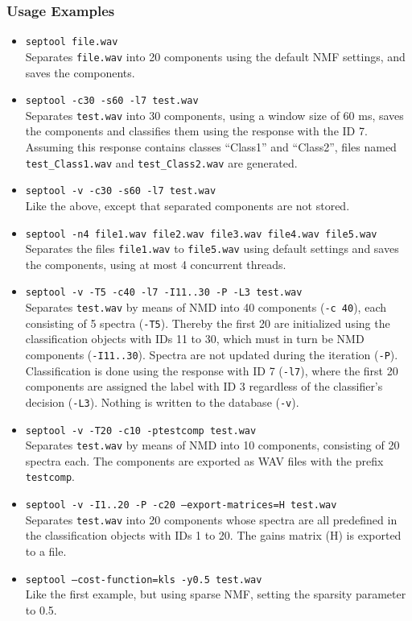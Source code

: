 \subsubsection{Usage Examples}

\begin{itemize}
  \item {\tt septool file.wav} \\
    Separates {\tt file.wav} into 20 components using the default NMF settings,
    and saves the components.
  \item {\tt septool -c30 -s60 -l7 test.wav}\\
    Separates {\tt test.wav} into 30 components, using a window size of 60 ms,
    saves the components and classifies them using the response with the ID
    7. Assuming this response contains classes ``Class1'' and ``Class2'', files
    named {\tt test\_Class1.wav} and {\tt test\_Class2.wav} are generated.
  \item {\tt septool -v -c30 -s60 -l7 test.wav}\\
    Like the above, except that separated components are not stored.
  \item {\tt septool -n4 file1.wav file2.wav file3.wav file4.wav
      file5.wav}\\
    Separates the files {\tt file1.wav} to {\tt file5.wav} using default
    settings and saves the components, using at most 4 concurrent threads.
  \item {\tt septool -v -T5 -c40 -l7 -I11..30 -P -L3 test.wav}\\
    Separates {\tt test.wav} by means of NMD into 40 components
    ({\tt -c 40}), each consisting of 5 spectra ({\tt -T5}). Thereby the first
    20 are initialized using the classification objects with IDs 11 to 30,
    which must in turn be NMD components ({\tt -I11..30}). Spectra are not
    updated during the iteration ({\tt -P}).  Classification is done using the
    response with ID 7 ({\tt -l7}), where the first 20 components are assigned
    the label with ID 3 regardless of the classifier's decision ({\tt -L3}).
    Nothing is written to the database ({\tt -v}).
  \item {\tt septool -v -T20 -c10 -ptestcomp test.wav}\\
    Separates {\tt test.wav} by means of NMD into 10 components, consisting 
    of 20 spectra each. The components are exported as WAV files with the 
    prefix {\tt testcomp}.
  \item {\tt septool -v -I1..20 -P -c20 --export-matrices=H test.wav}\\
    Separates {\tt test.wav} into 20 components whose spectra are all 
    predefined in the classification objects with IDs 1 to 20.
    The gains matrix (H) is exported to a file.
  \item {\tt septool --cost-function=kls -y0.5 test.wav}\\
    Like the first example, but using sparse NMF, 
    setting the sparsity parameter to 0.5.
\end{itemize}


